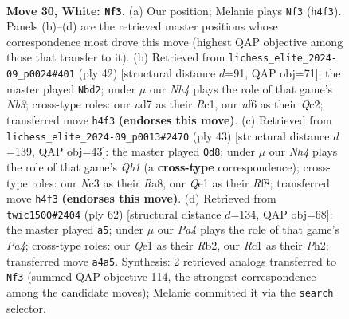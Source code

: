\documentclass[11pt]{article}
\begin{document}
\clearpage

\begin{figure}[p]\centering
\begin{subfigure}{0.46\textwidth}\centering
\resizebox{\linewidth}{!}{%
\newchessgame
\chessboard[
  setfen={3r2k1/3nq1p1/rp1ppn2/4p2p/P3P2N/2N3P1/2P2P1P/R1R1Q1K1 w - - 4 30},
  showmover=false,
  pgfstyle=straightmove, color=movearrow, markmove={h4-f3}
]}
\caption{}
\end{subfigure}\hfill
\begin{subfigure}{0.46\textwidth}\centering
\resizebox{\linewidth}{!}{%
\newchessgame
\chessboard[
  setfen={rn1r2k1/2q1np2/1pp1p1p1/4P1Pp/2RP4/1N3N2/1PQ2PP1/2R3K1 w - - 5 22},
  showmover=false,
  pgfstyle=straightmove, color=movearrow, markmove={b3-d2}
]}
\caption{}
\end{subfigure}
\\[4pt]
\begin{subfigure}{0.46\textwidth}\centering
\resizebox{\linewidth}{!}{%
\newchessgame
\chessboard[
  setfen={rq3rk1/p4pp1/Qp1p2np/3Pp2n/4P3/P4NP1/1PRN1P1P/2R3K1 b - - 0 22},
  showmover=false,
  pgfstyle=straightmove, color=movearrow, markmove={b8-d8}
]}
\caption{}
\end{subfigure}\hfill
\begin{subfigure}{0.46\textwidth}\centering
\resizebox{\linewidth}{!}{%
\newchessgame
\chessboard[
  setfen={4r1k1/3q1pp1/rpp2n1p/3p4/PQ1P1P2/2N1P3/1R3P1P/R4K2 w - - 1 32},
  showmover=false,
  pgfstyle=straightmove, color=movearrow, markmove={a4-a5}
]}
\caption{}
\end{subfigure}
\caption{\textbf{Move 30, White: \texttt{Nf3}.} (a) Our position; Melanie plays \texttt{Nf3} (\texttt{h4f3}). Panels (b)--(d) are the retrieved master positions whose correspondence most drove this move (highest QAP objective among those that transfer to it). (b) Retrieved from \texttt{lichess\_elite\_2024-09\_p0024\#401} (ply 42) [structural distance $d$=91, QAP obj=71]: the master played \texttt{Nbd2}; under $\mu$ our \emph{Nh4} plays the role of that game's \emph{Nb3}; cross-type roles: our \emph{n}d7 as their \emph{R}c1, our \emph{n}f6 as their \emph{Q}c2; transferred move \texttt{h4f3} \textbf{(endorses this move)}. (c) Retrieved from \texttt{lichess\_elite\_2024-09\_p0013\#2470} (ply 43) [structural distance $d$=139, QAP obj=43]: the master played \texttt{Qd8}; under $\mu$ our \emph{Nh4} plays the role of that game's \emph{Qb1} (a \textbf{cross-type} correspondence); cross-type roles: our \emph{N}c3 as their \emph{R}a8, our \emph{Q}e1 as their \emph{R}f8; transferred move \texttt{h4f3} \textbf{(endorses this move)}. (d) Retrieved from \texttt{twic1500\#2404} (ply 62) [structural distance $d$=134, QAP obj=68]: the master played \texttt{a5}; under $\mu$ our \emph{Pa4} plays the role of that game's \emph{Pa4}; cross-type roles: our \emph{Q}e1 as their \emph{R}b2, our \emph{R}c1 as their \emph{P}h2; transferred move \texttt{a4a5}. Synthesis: 2 retrieved analogs transferred to \texttt{Nf3} (summed QAP objective 114, the strongest correspondence among the candidate moves); Melanie committed it via the \texttt{search} selector.}
\label{fig:thought-m58}
\end{figure}
\end{document}
